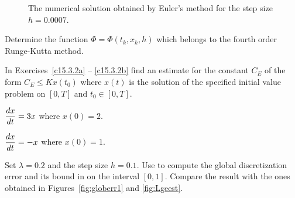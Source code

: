 \documentclass{ximera}
\begin{document}
\begin{figure}[htb]
   \centerline{%
   }
   \caption{The numerical solution obtained by Euler's method for the 
   step size $h=0.0007$.}
   \label{fig:hsmall}
\end{figure}

\EXER

\TEXER

\begin{exercise} \label{c15.3.1}
Determine the function $\Phi=\Phi(t_k,x_k,h)$ which belongs to the 
fourth order Runge-Kutta method.
\end{exercise}

\noindent In Exercises~\ref{c15.3.2a} -- \ref{c15.3.2b} find an estimate
for the constant $C_E$ of the form $C_E \le Kx(t_0)$ where $x(t)$ is the
solution of the specified initial value problem on $[0,T]$ and $t_0\in[0,T]$.
\begin{exercise} \label{c15.3.2a}
$\displaystyle\frac{dx}{dt} = 3 x$ where $x(0) = 2$.
\end{exercise}
\begin{exercise} \label{c15.3.2b}
$\displaystyle\frac{dx}{dt} = -x$ where $x(0) = 1$.
\end{exercise}


\CEXER

\begin{exercise} \label{c15.3.3}
Set $\lambda=0.2$ and the step size $h=0.1$.  Use \Matlab to compute 
the global discretization error and its bound in 
on the interval $[0,1]$.  Compare the result with the ones obtained 
in Figures~\ref{fig:globerr1} and \ref{fig:Lgeest}.
\end{exercise}
\end{document}
